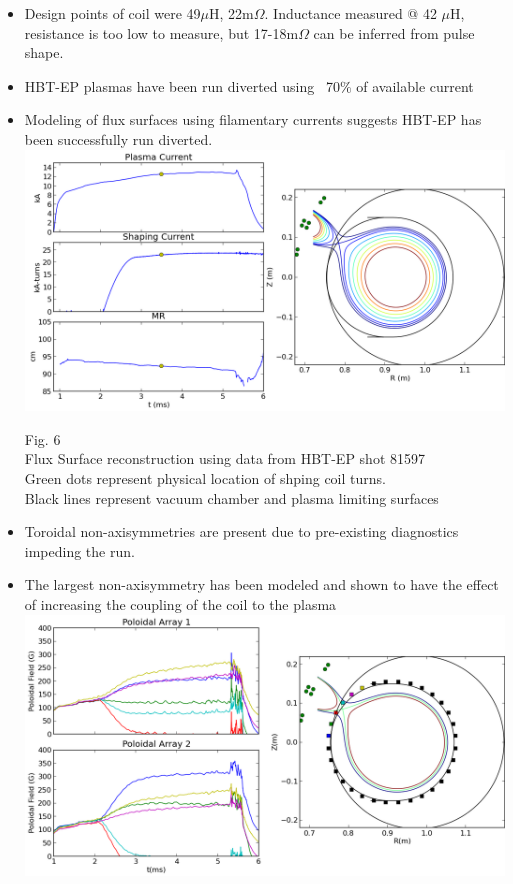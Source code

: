 \documentclass{article}
\begin{document}
\begin{multicols}{5}
\begin{itemize}
\begin{center}
Fig. 5\\
SPICE simulation of standard discharge\\
compared to current as meaured in the coil\\
\end{center}
\item Design points of coil were 49$\mu$H, 22m$\Omega$. Inductance measured @ 42 $\mu$H, resistance is too low to measure, but 17-18m$\Omega$ can be inferred from pulse shape.
\item HBT-EP plasmas have been run diverted using ~70$\%$ of available current
\item Modeling of flux surfaces using filamentary currents suggests HBT-EP has been successfully run diverted.\\
\vspace{.25in}
\includegraphics[width=0.9\columnwidth]{flux_surfaces_during_shaping.png}
\begin{center}
Fig. 6\\
Flux Surface reconstruction using data from HBT-EP shot 81597\\
Green dots represent physical location of shping coil turns.\\
Black lines represent vacuum chamber and plasma limiting surfaces\\
\end{center}
\vspace{.25in}
\item Toroidal non-axisymmetries are present due to pre-existing diagnostics impeding the run.
\item The largest non-axisymmetry has been modeled and shown to have the effect of increasing the coupling of the coil to the plasma\\
\vspace{.25in}
\includegraphics[width=0.9\columnwidth]{poloidal_field_cancellation_APS_2013.png}

\end{itemize}
\end{multicols}
\end{document}
